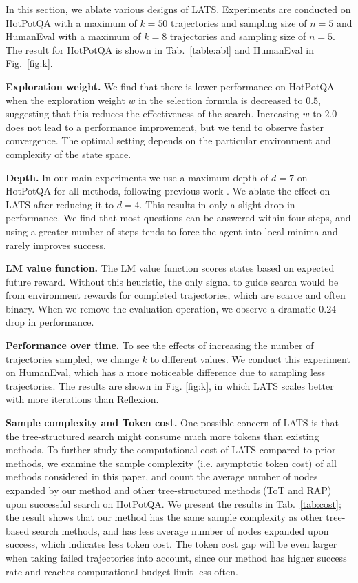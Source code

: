 \documentclass{article} \usepackage{iclr2024_conference,times}
\begin{document}
{In this section, we ablate various designs of LATS. Experiments are conducted on HotPotQA with a maximum of $k=50$ trajectories and sampling size of $n=5$ and HumanEval with a maximum of $k=8$ trajectories and sampling size of $n=5$. The result for HotPotQA is shown in Tab.~\ref{table:abl} and HumanEval in Fig.~\ref{fig:k}.

\textbf{Exploration weight.} We find that there is lower performance on HotPotQA when the exploration weight $w$ in the selection formula is decreased to $0.5$, suggesting that this reduces the effectiveness of the search. Increasing $w$ to $2.0$ does not lead to a performance improvement, but we tend to observe faster convergence. The optimal setting depends on the particular environment and complexity of the state space.

\textbf{Depth.} In our main experiments we use a maximum depth of $d=7$ on HotPotQA for all methods, following previous work \citep{yao2023react}. We ablate the effect on LATS after reducing it to $d=4$. This results in only a slight drop in performance. We find that most questions can be answered within four steps, and using a greater number of steps tends to force the agent into local minima and rarely improves success.

\textbf{LM value function.} The LM value function scores states based on expected future reward. Without this heuristic, the only signal to guide search would be from environment rewards for completed trajectories, which are scarce and often binary. When we remove the evaluation operation, we observe a dramatic $0.24$ drop in performance.

\textbf{Performance over time.} To see the effects of increasing the number of trajectories sampled, we change $k$ to different values. We conduct this experiment on HumanEval, which has a more noticeable difference due to sampling less trajectories. The results are shown in Fig. \ref{fig:k}, in which LATS scales better with more iterations than Reflexion.

\textbf{Sample complexity and Token cost.} One possible concern of LATS is that the tree-structured search might consume much more tokens than existing methods. To further study the computational cost of LATS compared to prior methods, we examine the sample complexity (i.e. asymptotic token cost) of all methods considered in this paper, and count the average number of nodes expanded by our method and other tree-structured methods (ToT and RAP) upon successful search on HotPotQA. We present the results in Tab.~\ref{tab:cost}; the result shows that our method has the same sample complexity as other tree-based search methods, and has less average number of nodes expanded upon success, which indicates less token cost. The token cost gap will be even larger when taking failed trajectories into account, since our method has higher success rate and reaches computational budget limit less often.

}
\end{document}
